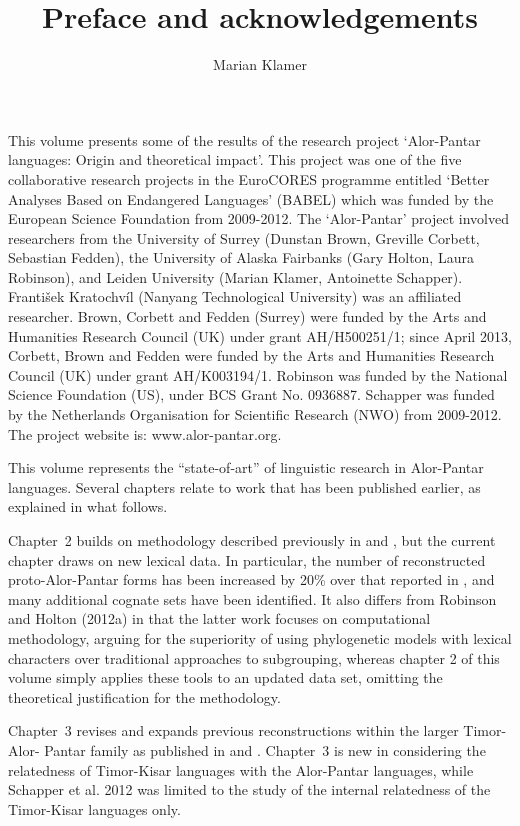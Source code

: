 \documentclass[output=paper]{LSP/langsci}
\author{Marian Klamer}
\title{Preface and acknowledgements}
\begin{document}
\noindent
This volume presents some of the results of the research project `Alor-Pantar languages: Origin and theoretical impact'. This project was one of the five collaborative research projects in the EuroCORES programme entitled `Better Analyses Based on Endangered Languages' (BABEL) which was funded by the European Science Foundation from 2009-2012. The `Alor-Pantar' project involved researchers from the University of Surrey (Dunstan Brown, Greville Corbett, Sebastian Fedden), the University of Alaska Fairbanks (Gary Holton, Laura Robinson), and Leiden University (Marian Klamer, Antoinette Schapper). František Kratochvíl (Nanyang Technological University) was an affiliated researcher. Brown, Corbett and Fedden (Surrey) were funded by the Arts and Humanities Research Council (UK) under grant AH/H500251/1; since April 2013,  Corbett, Brown and Fedden were funded by the Arts and Humanities Research Council (UK) under grant AH/K003194/1. Robinson was funded by the National Science Foundation (US), under BCS Grant No. 0936887. Schapper was funded by the Netherlands Organisation for Scientific Research (NWO) from 2009-2012. The project website is: www.alor-pantar.org.  
	
	This volume represents the ``state-of-art'' of linguistic research in Alor-Pantar languages. Several chapters relate to work that has been published earlier, as explained in what follows. 
	
	Chapter~2 builds on methodology described previously in \citet{HoltonEtAl2012} and \citet{RobinsonEtAl2012internal}, but the current chapter draws on new lexical data. In particular, the number of reconstructed proto-Alor-Pantar forms has been increased by 20\% over that reported in \citet{HoltonEtAl2012}, and many additional cognate sets have been identified. It also differs from Robinson and Holton (2012a) in that the latter work focuses on computational methodology, arguing for the superiority of using phylogenetic models with lexical characters over traditional approaches to subgrouping, whereas chapter 2 of this volume simply applies these tools to an updated data set, omitting the theoretical justification for the methodology. 
	
	Chapter~3 revises and expands previous reconstructions within the larger Timor-Alor- Pantar family as published in \citet{HoltonEtAl2012} and \citet{SchapperEtAl2012}. Chapter~3 is new in considering the relatedness of Timor-Kisar languages with the Alor-Pantar languages, while Schapper et al. 2012 was limited to the study of the internal relatedness of the Timor-Kisar languages only.
	
\end{document}

